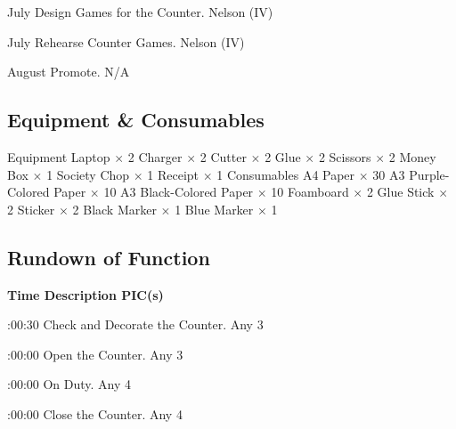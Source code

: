 \bTR{}
\eTD{} July
\eTD\bTD Design Games for the Counter.
\eTD\bTD Nelson (IV)
\eTD\eTR

\bTR{}
\eTD{} July
\eTD\bTD Rehearse Counter Games.
\eTD\bTD Nelson (IV)
\eTD\eTR

\bTR{}
\eTD{} August
\eTD\bTD Promote.
\eTD\bTD N/A
\eTD\eTR

\eTABLEbody
\eTABLE

\subsection{Equipment \& Consumables}
\starttabulate[|l|l|]
\NC{}Equipment\NC\NR
\HL
\NC Laptop                  \NC $\times$ 2  \NR
\NC Charger                 \NC $\times$ 2  \NR
\NC Cutter                  \NC $\times$ 2  \NR
\NC Glue                    \NC $\times$ 2  \NR
\NC Scissors                \NC $\times$ 2  \NR
\NC Money Box               \NC $\times$ 1  \NR
\NC Society Chop            \NC $\times$ 1  \NR
\NC Receipt                 \NC $\times$ 1  \NR
\HL
\NR
\NC{}Consumables\NC\NR
\HL
\NC A4 Paper                \NC $\times$ 30 \NR
\NC A3 Purple-Colored Paper \NC $\times$ 10 \NR
\NC A3 Black-Colored Paper  \NC $\times$ 10 \NR
\NC Foamboard               \NC $\times$ 2  \NR
\NC Glue Stick              \NC $\times$ 2  \NR
\NC Sticker                 \NC $\times$ 2  \NR
\NC Black Marker            \NC $\times$ 1  \NR
\NC Blue Marker             \NC $\times$ 1  \NR
\HL
\stoptabulate

\subsection{Rundown of Function}

\setupTABLE[c][1][width=1.25in]
\setupTABLE[c][2][width=3.5in]
\setupTABLE[c][3][width=1.25in]
\bTABLE
\bTABLEhead

\bTR\bTH    \bf{Time}
\eTH\bTH    \bf{Description}
\eTH\bTH    \bf{PIC(s)}
\eTH\eTR

\eTABLEhead
\bTABLEbody

\bTR{}:00:30
\eTD\bTD Check and Decorate the Counter.
\eTD\bTD Any 3
\eTD\eTR

\bTR{}:00:00
\eTD\bTD Open the Counter.
\eTD\bTD Any 3
\eTD\eTR

\bTR{}:00:00
\eTD\bTD On Duty.
\eTD\bTD Any 4
\eTD\eTR

\bTR{}:00:00
\eTD\bTD Close the Counter.
\eTD\bTD Any 4
\eTD\eTR

\eTABLEbody
\eTABLE

\pagebreak

